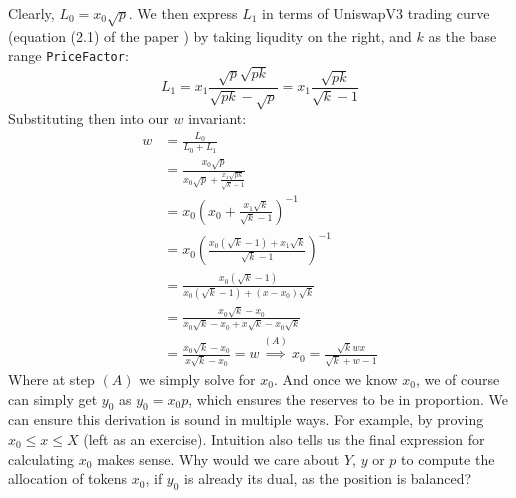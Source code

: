 \documentclass[11pt]{article}
\begin{document}
Clearly, $L_0 = x_0\sqrt p$. We then express $L_1$ in terms of UniswapV3
trading curve (equation (2.1) of the paper \cite{uniswapv3}) by taking
liqudity on the right, and $k$ as the base range \texttt{PriceFactor}:
\[
L_1 = x_1\frac{\sqrt{p}\sqrt{pk}}{\sqrt{pk}-\sqrt{p}}
    = x_1\frac{\sqrt{pk}}{\sqrt k - 1}
\]
Substituting then into our $w$ invariant:
\begin{equation*}
\begin{split}
w &= \frac{L_0}{L_0 + L_1}\\
  &= \frac{x_0\sqrt p}{x_0\sqrt p + \frac{x_1\sqrt{pk}}{\sqrt k - 1}}\\
  &= x_0\left({x_0 + \frac{x_1\sqrt{k}}{\sqrt k - 1}}\right)^{-1}\\
  &= x_0\left(
    \frac{x_0(\sqrt k - 1) + x_1\sqrt k}{\sqrt k - 1}
  \right)^{-1}\\
  &= \frac{x_0(\sqrt k -1)}{x_0(\sqrt k -1) + (x-x_0)\sqrt k}\\
  &= \frac{x_0\sqrt k - x_0}{x_0\sqrt k -x_0 + x\sqrt k - x_0\sqrt k}\\
  &= \frac{x_0\sqrt k - x_0}{x\sqrt k - x_0} =w
  \stackrel{(A)}\implies x_0 = \frac{\sqrt k wx}{\sqrt k + w - 1}
\end{split}
\end{equation*}
Where at step $(A)$ we simply solve for $x_0$. And once we know $x_0$,
we of course can simply get $y_0$ as $y_0 = x_0p$, which ensures the
reserves to be in proportion. We can ensure this derivation is sound
in multiple ways. For example, by proving $x_0 \leq x \leq X$ (left as an exercise).
Intuition also tells us the final expression for calculating $x_0$ makes sense.
Why would we care about $Y$, $y$ or $p$ to compute the allocation of tokens $x_0$,
if $y_0$ is already its dual, as the position is balanced?


\break
\end{document}
